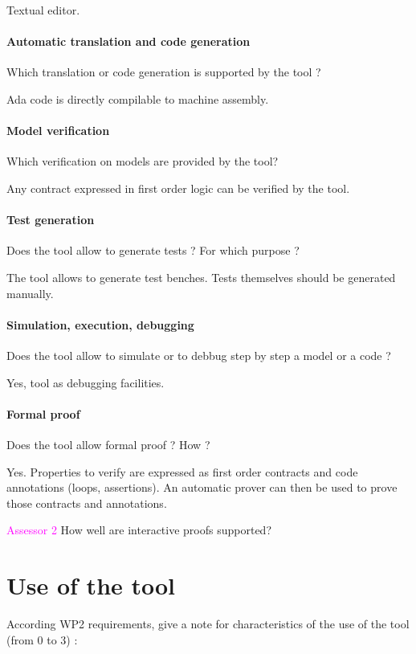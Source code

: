 Textual editor.

\paragraph{Automatic translation and code generation}
Which translation or code generation is supported by the tool ?

Ada code is directly compilable to machine assembly.

\paragraph{Model verification}
Which verification on models are provided by the tool?

Any contract expressed in first order logic can be verified by the
tool.

\paragraph{Test generation}
Does the tool allow to generate tests ? For  which purpose ?

The tool allows to generate test benches. Tests themselves should be
generated manually.

\paragraph{Simulation, execution, debugging}
Does the tool allow to simulate or to debbug step by step a model or a code ?

Yes, tool as debugging facilities.

\paragraph{Formal proof}
Does the tool allow formal proof ?  How ?

Yes. Properties to verify are expressed as first order contracts and
code annotations (loops, assertions). An automatic prover can then be
used to prove those contracts and annotations.

\textcolor{magenta}{Assessor 2} How well are interactive proofs supported?

\section{Use of the tool}


According WP2 requirements, give a note for characteristics of the use of the tool (from 0 to 3) :

